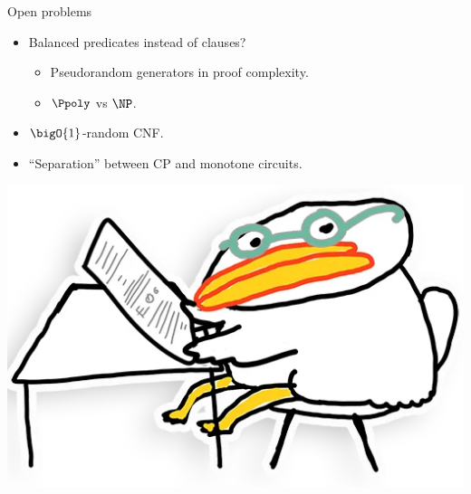 \begin{frame}{Open problems}

    \begin{itemize}
        \item Balanced predicates instead of clauses?
            \begin{itemize}
                \item Pseudorandom generators in proof complexity.
                \item $\Ppoly$ vs $\NP$.
            \end{itemize}
        \item $\bigO{1}$-random CNF.
        \item ``Separation'' between CP and monotone circuits.
    \end{itemize}

    \vspace{1cm}
    \centering
    \includegraphics[scale = 0.1]{pics/utia-think.png}
\end{frame}